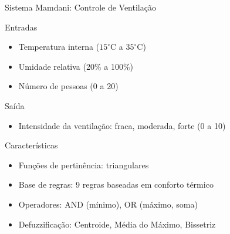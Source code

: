 \documentclass[aspectratio=169]{beamer}
\begin{document}
\begin{frame}{Sistema Mamdani: Controle de Ventilação}
    \begin{block}{Entradas}
        \begin{itemize}
            \item Temperatura interna (\(15^\circ\)C a \(35^\circ\)C)
            \item Umidade relativa (20\% a 100\%)
            \item Número de pessoas (0 a 20)
        \end{itemize}
    \end{block}
    \begin{block}{Saída}
        \begin{itemize}
            \item Intensidade da ventilação: fraca, moderada, forte (0 a 10)
        \end{itemize}
    \end{block}
    \begin{block}{Características}
        \begin{itemize}
            \item Funções de pertinência: triangulares
            \item Base de regras: 9 regras baseadas em conforto térmico
            \item Operadores: AND (mínimo), OR (máximo, soma)
            \item Defuzzificação: Centroide, Média do Máximo, Bissetriz
        \end{itemize}
    \end{block}
\end{frame}
\end{document}
